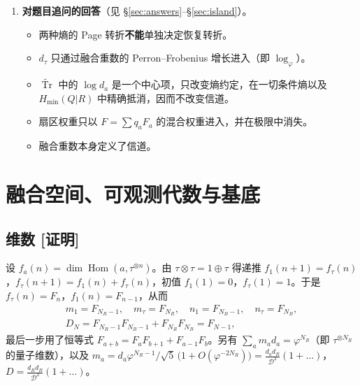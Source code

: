 \documentclass[11pt,a4paper,UTF8]{ctexart}
\newcommand{\tTr}{\widetilde{\operatorname{Tr}}}
\newcommand{\tagP}{\texorpdfstring{\textcolor{cP}{\textbf{[证明]}}}{[证明]}}
\begin{document}
\begin{enumerate}[leftmargin=*,label=\textbf{\arabic*.}]
\item \textbf{对题目追问的回答}（见 \S\ref{sec:answers}--\S\ref{sec:island}）。
\begin{itemize}
  \item 两种熵的 Page 转折\textbf{不能}单独决定恢复转折。
  \item $d_\tau$ 只通过融合重数的 Perron--Frobenius 增长进入（即 $\log_\varphi$）。
  \item $\tTr$ 中的 $\log d_a$ 是一个中心项，只改变熵约定，在一切条件熵以及 $H_{\min}(Q|R)$ 中精确抵消，因而不改变信道。
  \item 扇区权重只以 $F=\sum q_aF_a$ 的混合权重进入，并在极限中消失。
  \item 融合重数本身定义了信道。
\end{itemize}
\end{enumerate}

\section{融合空间、可观测代数与基底}\label{sec:basis}

\subsection{维数 \tagP}\label{ss:dims}
设 $f_a(n)=\dim\operatorname{Hom}(a,\tau^{\otimes n})$。由 $\tau\otimes\tau=1\oplus\tau$ 得递推
$f_1(n+1)=f_\tau(n)$，$f_\tau(n+1)=f_1(n)+f_\tau(n)$，初值 $f_1(1)=0$，$f_\tau(1)=1$。于是 $f_\tau(n)=F_n$，$f_1(n)=F_{n-1}$，从而
\begin{gather*}
m_1=F_{N_R-1},\quad m_\tau=F_{N_R},\quad n_1=F_{N_B-1},\quad n_\tau=F_{N_B},\\
D_N=F_{N_R-1}F_{N_B-1}+F_{N_R}F_{N_B}=F_{N-1},
\end{gather*}
最后一步用了恒等式 $F_{a+b}=F_aF_{b+1}+F_{a-1}F_b$。另有 $\sum_am_ad_a=\varphi^{N_R}$（即 $\tau^{\otimes N_R}$ 的量子维数），以及
$m_a=d_a\varphi^{N_R-1}/\sqrt5\,\big(1+O(\varphi^{-2N_R})\big)=\frac{d_ad_R}{\mathcal D^2}(1+\dots)$，$D=\frac{d_Rd_B}{\mathcal D^2}(1+\dots)$。
\end{document}
